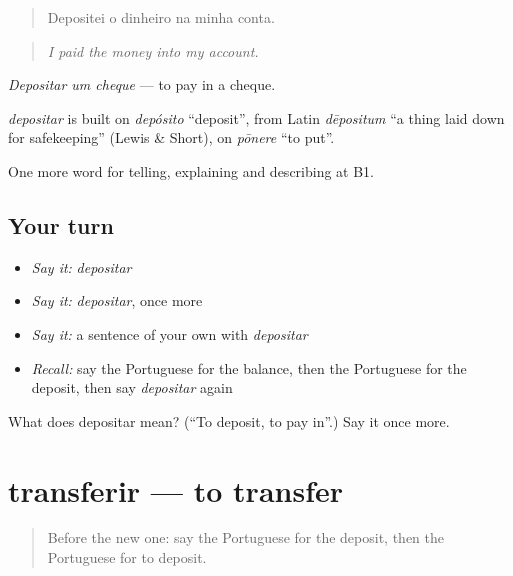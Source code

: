 \begin{quote}
Depositei o dinheiro na minha conta.
\end{quote}

\begin{quote}
\emph{I paid the money into my account.}
\end{quote}

\emph{Depositar um cheque} — to pay in a cheque.

\begin{cousinweb}
\emph{depositar} is built on \emph{depósito} \textquotedblleft{}deposit\textquotedblright{}, from Latin \emph{dēpositum} \textquotedblleft{}a thing laid down for safekeeping\textquotedblright{} (Lewis \& Short), on \emph{pōnere} \textquotedblleft{}to put\textquotedblright{}.
\end{cousinweb}

\begin{grammarlens}[title={What you've built}]
One more word for telling, explaining and describing at B1.
\end{grammarlens}

\subsection*{Your turn}
\begin{itemize}
\raggedright
  \item \emph{Say it:} \emph{depositar}
  \item \emph{Say it:} \emph{depositar}, once more
  \item \emph{Say it:} a sentence of your own with \emph{depositar}
  \item \emph{Recall:} say the Portuguese for the balance, then the Portuguese for the deposit, then say \emph{depositar} again
\end{itemize}

\begin{tcolorbox}[breakable,colback=teal!4,colframe=teal!35!black,title={Before you move on}]
What does depositar mean? (\textquotedblleft{}To deposit, to pay in\textquotedblright{}.) Say it once more.
\end{tcolorbox}
\section[transferir]{transferir — to transfer}

\label{lesson:PT-C393-transferir}



\begin{quote}
Before the new one: say the Portuguese for the deposit, then the Portuguese for to deposit.
\end{quote}

